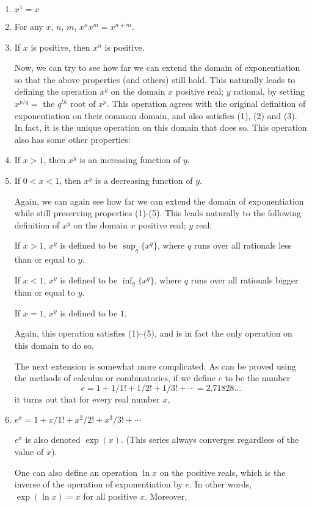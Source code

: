 \begin{enumerate}
  \item $x^1 = x$
  \item For any $x$, $n$, $m$, $x^n x^m = x^{n+m}$.
  \item If $x$ is positive, then $x^n$ is positive.

  Now, we can try to see how far we can extend the domain of
  exponentiation so that the above properties (and others) still hold.
  This naturally leads to defining the operation $x^y$ on the domain
  {$x$ positive real; $y$ rational}, by setting $x^{p/q} =$ the $q^{th}$
  root of $x^p$.  This operation agrees with the original definition of
  exponentiation on their common domain, and also satisfies (1), (2) and
  (3).  In fact, it is the unique operation on this domain that does so.
  This operation also has some other properties:

  \item If $x>1$, then $x^y$ is an increasing function of $y$.
  \item If $0<x<1$, then $x^y$ is a decreasing function of $y$.

  Again, we can again see how far we can extend the domain of
  exponentiation while still preserving properties (1)-(5).  This leads
  naturally to the following definition of $x^y$ on the domain {$x$
    positive real; $y$ real}:

  If $x > 1$, $x^y$ is defined to be $\sup_q\{x^q\}$, where $q$ runs
  over all rationals less than or equal to $y$.

  If $x < 1$, $x^y$ is defined to be $\inf_q\{x^q\}$, where $q$ runs
  over all rationals bigger than or equal to $y$.

  If $x = 1$, $x^y$ is defined to be $1$.

  Again, this operation satisfies (1)--(5), and is in fact the only
  operation on this domain to do so.

  The next extension is somewhat more complicated.  As can be proved
  using the methods of calculus or combinatorics, if we define $e$ to be
  the number
  \[
  e = 1 + 1/1! + 1/2! + 1/3! + \cdots = 2.71828...
  \]
  it turns out that for every real number $x$,

  \item $ e^x = 1 + x/1! + x^2/2! + x^3/3! + \cdots$

  $e^x$ is also denoted $\exp(x)$.  (This series always converges
  regardless of the value of $x$).

  One can also define an operation $\ln x$ on the positive reals, which
  is the inverse of the operation of exponentiation by $e$.  In other
  words, $\exp(\ln x) = x$ for all positive $x$.  Moreover,


\end{enumerate}
